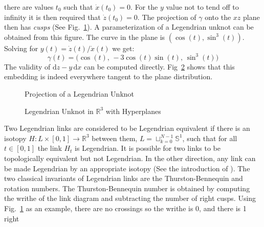 \documentclass{article}
\theoremstyle{plain}
\begin{document}
        there are values $t_{0}$ such that $\dot{x}(t_{0})=0$. For the $y$
        value not to tend off to infinity it is then required that
        $\dot{z}(t_{0})=0$. The projection of $\gamma$ onto the $xz$ plane then
        has \textit{cusps} (See Fig.~\ref{fig:legendrian_unknot_cusps_001}).
        A parameterization of a Legendrian unknot can be obtained from this
        figure. The curve in the plane is $(\cos(t),\sin^{3}(t))$. Solving for
        $y(t)=\dot{z}(t)/\dot{x}(t)$ we get:
        \begin{equation}
            \gamma(t)=\Big(\cos(t),\,-3\cos(t)\sin(t),\,\sin^{3}(t)\Big)
        \end{equation}
        The validity of $\textrm{d}z-y\,\textrm{d}x$ can be computed directly.
        Fig~\ref{fig:legendrian_unknot_002} shows that this embedding is indeed
        everywhere tangent to the plane distribution.
        \begin{figure}
            \centering
            \caption{Projection of a Legendrian Unknot}
            \label{fig:legendrian_unknot_cusps_001}
        \end{figure}
        \begin{figure}
            \centering
            \caption{Legendrian Unknot in $\mathbb{R}^{3}$ with Hyperplanes}
            \label{fig:legendrian_unknot_002}
        \end{figure}
        Two Legendrian links are considered to be Legendrian equivalent if
        there is an isotopy $H:L\times[0,1]\rightarrow\mathbb{R}^{3}$ between
        them, $L=\sqcup_{k=0}^{N-1}\mathbb{S}^{1}$, such that for all
        $t\in[0,1]$ the link $H_{t}$ is Legendrian. It is possible for two links
        to be topologically equivalent but not Legendrian. In the other
        direction, any link can be made Legendrian by an appropriate isotopy
        (See the introduction of \cite{VeraVertessiTransNonSimpleKnots}). The
        two classical invariants of Legendrian links are the Thurston-Bennequin
        and rotation numbers. The Thurston-Bennequin number is obtained by
        computing the writhe of the link diagram and subtracting the number of
        right cusps. Using Fig.~\ref{fig:legendrian_unknot_cusps_001} as an
        example, there are no crossings so the writhe is 0, and there is 1 right
\end{document}
